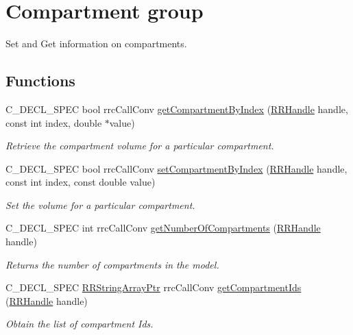 \hypertarget{group__compartment}{}\section{Compartment group}
\label{group__compartment}


Set and Get information on compartments.  


\subsection*{Functions}
\begin{DoxyCompactItemize}
\item 
C\+\_\+\+D\+E\+C\+L\+\_\+\+S\+P\+E\+C bool rrc\+Call\+Conv \hyperlink{group__compartment_ga4ed76bba681918dd733c0857c160c2cb}{get\+Compartment\+By\+Index} (\hyperlink{rrc__types_8h_a1d68f0592372208fa5a5f2799ea4b3ae}{R\+R\+Handle} handle, const int index, double $\ast$value)
\begin{DoxyCompactList}\small\item\em Retrieve the compartment volume for a particular compartment. \end{DoxyCompactList}\item 
C\+\_\+\+D\+E\+C\+L\+\_\+\+S\+P\+E\+C bool rrc\+Call\+Conv \hyperlink{group__compartment_ga8baaf727b28d0acc9fdb90ae5682e4d7}{set\+Compartment\+By\+Index} (\hyperlink{rrc__types_8h_a1d68f0592372208fa5a5f2799ea4b3ae}{R\+R\+Handle} handle, const int index, const double value)
\begin{DoxyCompactList}\small\item\em Set the volume for a particular compartment. \end{DoxyCompactList}\item 
C\+\_\+\+D\+E\+C\+L\+\_\+\+S\+P\+E\+C int rrc\+Call\+Conv \hyperlink{group__compartment_gadb42e920ac63aa0b1b6d6a6a9c6fd504}{get\+Number\+Of\+Compartments} (\hyperlink{rrc__types_8h_a1d68f0592372208fa5a5f2799ea4b3ae}{R\+R\+Handle} handle)
\begin{DoxyCompactList}\small\item\em Returns the number of compartments in the model. \end{DoxyCompactList}\item 
C\+\_\+\+D\+E\+C\+L\+\_\+\+S\+P\+E\+C \hyperlink{rrc__types_8h_a7c9475df6c7337d99482b13a365e7596}{R\+R\+String\+Array\+Ptr} rrc\+Call\+Conv \hyperlink{group__compartment_ga319aa6ee06a7150d35c87f8ed2c9ab8a}{get\+Compartment\+Ids} (\hyperlink{rrc__types_8h_a1d68f0592372208fa5a5f2799ea4b3ae}{R\+R\+Handle} handle)
\begin{DoxyCompactList}\small\item\em Obtain the list of compartment Ids. \end{DoxyCompactList}\end{DoxyCompactItemize}


